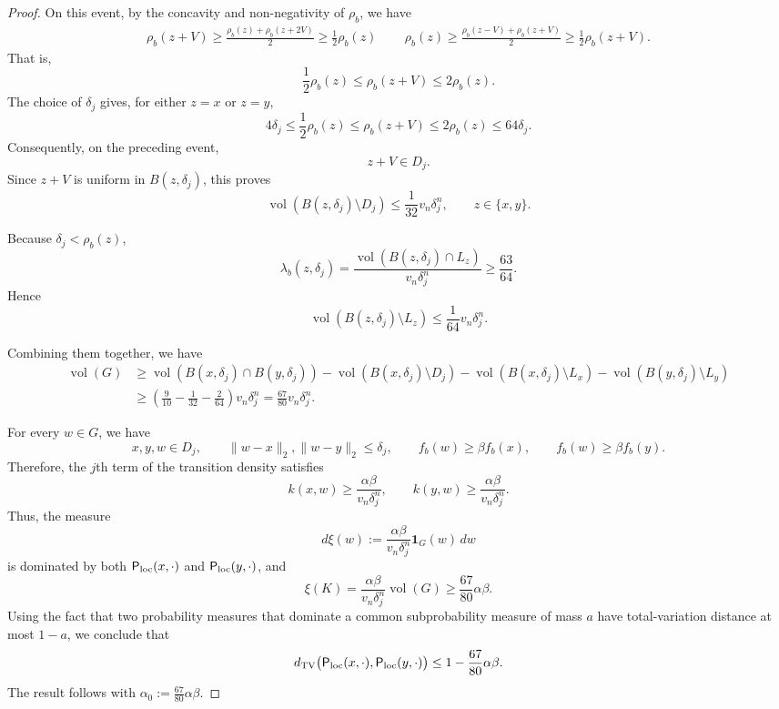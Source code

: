 \documentclass[11pt]{article}
\theoremstyle{definition}
\theoremstyle{remark}
\newcommand{\vol}{\operatorname{vol}}
\newcommand{\one}{\mathbf 1}
\newcommand{\dtv}{d_{\mathrm{TV}}}
\begin{document}
\begin{proof}
On this event, by the concavity and non-negativity of $\rho_b$, we have
\begin{align*}
    \rho_b(z+V)\geq \frac{\rho_b(z)+\rho_b(z+2V)}{2}\geq \frac{1}{2}\rho_b(z)\,\qquad \rho_b(z)\geq \frac{\rho_b(z-V)+\rho_b(z+V)}{2}\geq \frac{1}{2}\rho_b(z+V).
\end{align*}
That is,
\[
 \frac12\rho_b(z)
 \le
 \rho_b(z+V)
 \le
 2\rho_b(z).
\]
The choice of $\delta_j$ gives, for either $z=x$ or $z=y$,
\[
 4\delta_j
 \le\frac{1}{2}\rho_b(z)\leq \rho_b(z+V)\leq 2\rho_b(z)
 \le64\delta_j.
\]
Consequently, on the preceding event,
\[
 z+V\in D_j.
\]
Since $z+V$ is uniform in $B(z,\delta_j)$, this proves
\begin{equation}\label{eq:band-retention}
 \vol(B(z,\delta_j)\setminus D_j)
 \le
 \frac{1}{32} v_n\delta_j^n,\qquad z\in \{x,y\}.
\end{equation}


Because $\delta_j<\rho_b(z)$,
\[
 \lambda_b(z,\delta_j)
 =
 \frac{\vol(B(z,\delta_j)\cap L_z)}{v_n \delta_j^n}
 \ge\frac{63}{64}.
\]
Hence
\begin{equation}\label{eq:density-retention}
 \vol(B(z,\delta_j)\setminus L_z)
 \le \frac{1}{64}v_n \delta_j^n.
\end{equation}

Combining them together, we have 
\begin{align*}
 \vol(G)
 &\ge
 \vol(B(x,\delta_j)\cap B(y,\delta_j))
 -\vol(B(x,\delta_j)\setminus D_j)
 -\vol(B(x,\delta_j)\setminus L_x)
 -\vol(B(y,\delta_j)\setminus L_y)\\
 &\ge
 \left(
  \frac9{10}-\frac{1}{32} - \frac{2}{64}
 \right)v_n\delta_j^n = \frac{67}{80}v_n\delta_j^n.
\end{align*}

For every $w\in G$, we have
\[
 x,y,w\in D_j,
 \qquad
 \|w-x\|_2,\|w-y\|_2\le\delta_j,\qquad
 f_b(w)\ge\beta f_b(x),
 \qquad
 f_b(w)\ge\beta f_b(y).
\]
Therefore, the $j$th term of the transition density satisfies
\[
 k(x,w)\ge\frac{\alpha\beta}{v_n\delta_j^n},
 \qquad
 k(y,w)\ge\frac{\alpha\beta}{v_n\delta_j^n}.
\]
Thus, the measure
\[
 d\xi(w)
 :=
 \frac{\alpha\beta}{v_n\delta_j^n}\one_G(w)\,dw
\]
is dominated by both
${\sf P}_{\rm loc}(x,\cdot)$ and
${\sf P}_{\rm loc}(y,\cdot)$, and
\[
 \xi(K)
 =
 \frac{\alpha\beta}{v_n\delta_j^n}\vol(G)
 \ge
  \frac{67}{80}\alpha\beta.
\]
Using the fact that two probability measures that dominate a common subprobability
measure of mass $a$ have total-variation distance at most $1-a$, we conclude that
\[
 \dtv\bigl(
 {\sf P}_{\rm loc}(x,\cdot),
 {\sf P}_{\rm loc}(y,\cdot)
 \bigr)
 \le
 1-\frac{67}{80}\alpha\beta.
\]
The result follows with
$\alpha_0:=\frac{67}{80}\alpha\beta$.
\end{proof}
\end{document}
